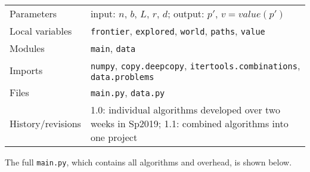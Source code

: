 \documentclass[../main.tex]{subfiles}
\begin{document}
\begin{table}[h!]
\begin{tabular}{|l|l|}
    Parameters           & input: $n$, $b$, $L$, $r$, $d$; output: $p'$, $v=value(p')$                                                \\
    Local variables      & \texttt{frontier}, \texttt{explored}, \texttt{world}, \texttt{paths}, \texttt{value}                       \\
    Modules              & \texttt{main}, \texttt{data}                                                                               \\
    Imports              & \texttt{numpy}, \texttt{copy.deepcopy}, \texttt{itertools.combinations}, \texttt{data.problems}            \\
    Files                & \texttt{main.py}, \texttt{data.py}                                                                         \\
    History/revisions    & 1.0: individual algorithms developed over two weeks in Sp2019; 1.1: combined algorithms into one project   \\
\hline
\end{tabular}
\end{table}

The full \texttt{main.py}, which contains all algorithms and overhead, is shown below.


\end{document}
